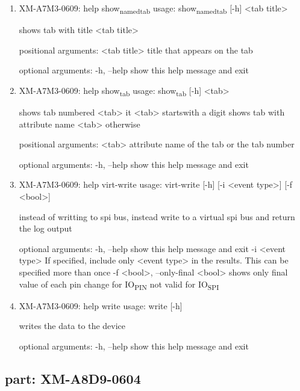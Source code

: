 \documentclass[11pt]{article}
\begin{document}
\begin{enumerate}
\item XM-A7M3-0609: help show\textsubscript{named}\textsubscript{tab}
\label{sec:orgb34038a}
usage: show\textsubscript{named}\textsubscript{tab} [-h] <tab title>

shows tab with title <tab title>

positional arguments:
  <tab title>  title that appears on the tab

optional arguments:
  -h, --help   show this help message and exit

\item XM-A7M3-0609: help show\textsubscript{tab}
\label{sec:orgc90512b}
usage: show\textsubscript{tab} [-h] <tab>

shows tab numbered <tab> it <tab> startswith a digit shows tab with attribute
name <tab> otherwise

positional arguments:
  <tab>       attribute name of the tab or the tab number

optional arguments:
  -h, --help  show this help message and exit

\item XM-A7M3-0609: help virt-write
\label{sec:org5e4817c}
usage: virt-write [-h] [-i <event type>] [-f <bool>]

instead of writting to spi bus, instead write to a virtual spi bus and return
the log output

optional arguments:
  -h, --help            show this help message and exit
  -i <event type>       If specified, include only <event type> in the
                        results. This can be specified more than once
  -f <bool>, --only-final <bool>
                        shows only final value of each pin change for IO\textsubscript{PIN}
                        not valid for IO\textsubscript{SPI}

\item XM-A7M3-0609: help write
\label{sec:org04b7093}
usage: write [-h]

writes the data to the device

optional arguments:
  -h, --help  show this help message and exit
\end{enumerate}

\subsection{part: XM-A8D9-0604}
\label{sec:org30afa18}
\end{document}
